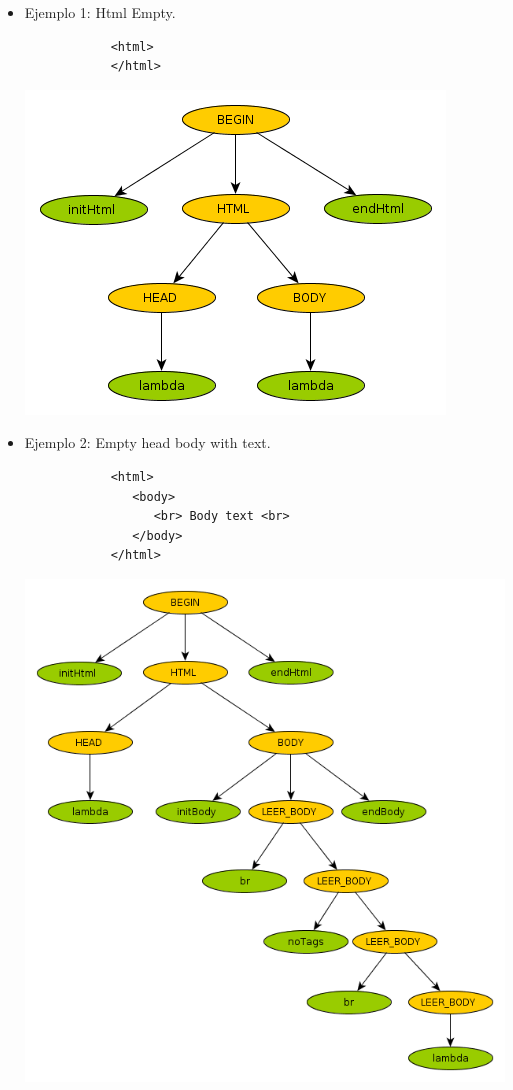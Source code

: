 


  \begin{itemize}

	\item{  Ejemplo 1: Html Empty.
		\begin{verbatim}
			<html>
			</html> 
		\end{verbatim}
	}


\begin{center}
	\includegraphics[scale=0.5]{Imagenes/1_html_empty.png}\\
\end{center}

	\item{  Ejemplo 2: Empty head body with text.
		\begin{verbatim}
			<html> 
			   <body> 
			      <br> Body text <br> 
			   </body> 
			</html> 
		\end{verbatim}
	}

\begin{center}
	\includegraphics[scale=0.45]{Imagenes/2_empty_head_body_with_text.png}\\
\end{center}


\end{itemize}
